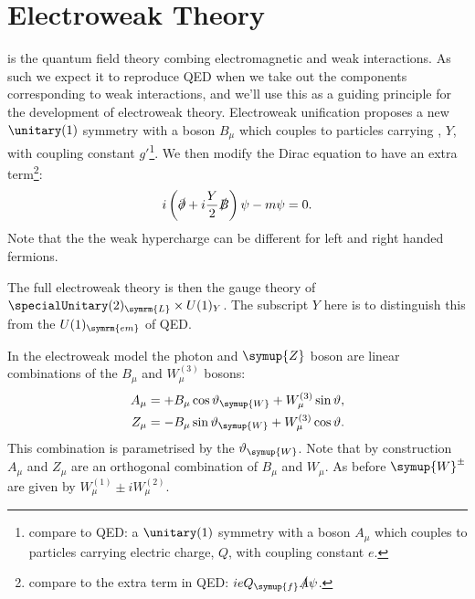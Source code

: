 \documentclass[fleqn]{NotesClass}
\newcommand{\Pparticle}[1]{\symup{#1}}
\newcommand{\PZ}{\ensuremath{\Pparticle{Z}}}
\newcommand{\PW}{\ensuremath{\Pparticle{W}}}
\newcommand{\PWpm}{\ensuremath{\Pparticle{W}^{\pm}}}
\newcommand{\Pf}{\ensuremath{\Pparticle{f}}}
\newcommand{\Left}{\symrm{L}}
\begin{document}
    \section{Electroweak Theory}
     is the quantum field theory combing electromagnetic and weak interactions.
    As such we expect it to reproduce QED when we take out the components corresponding to weak interactions, and we'll use this as a guiding principle for the development of electroweak theory.
    Electroweak unification proposes a new \(\unitary(1)\) symmetry with a boson \(B_\mu\) which couples to particles carrying , \(Y\), with coupling constant \(g'\)\footnote{compare to QED: a \(\unitary(1)\) symmetry with a boson \(A_\mu\) which couples to particles carrying electric charge, \(Q\), with coupling constant \(e\).}.
    We then modify the Dirac equation to have an extra term\footnote{compare to the extra term in QED: \(ieQ_{\Pf}\slashed{A}\psi\).}:
    \begin{equation}
        i\left( \slashed{\partial} + i\frac{Y}{2}\slashed{B} \right)\psi - m\psi = 0.
    \end{equation}
    Note that the the weak hypercharge can be different for left and right handed fermions.
    
    The full electroweak theory is then the gauge theory of \(\specialUnitary(2)_{\Left} \times U(1)_{Y}\).
    The subscript \(Y\) here is to distinguish this from the \(U(1)_{\symrm{em}}\) of QED.
    
    In the electroweak model the photon and \PZ{} boson are linear combinations of the \(B_\mu\) and \(W^{(3)}_\mu\) bosons:
    \begin{align}
        A_\mu &= +B_\mu \cos\vartheta_{\PW} + W_\mu^{(3)} \sin\vartheta,\\
        Z_\mu &= -B_\mu \sin\vartheta_{\PW} + W_\mu^{(3)} \cos\vartheta.
    \end{align}
    This combination is parametrised by the  \(\vartheta_{\PW}\).
    Note that by construction \(A_\mu\) and \(Z_\mu\) are an orthogonal combination of \(B_\mu\) and \(W_\mu\).
    As before \(\PWpm\) are given by \(W^{(1)}_\mu \pm i W^{(2)}_\mu\).
    
\end{document}

